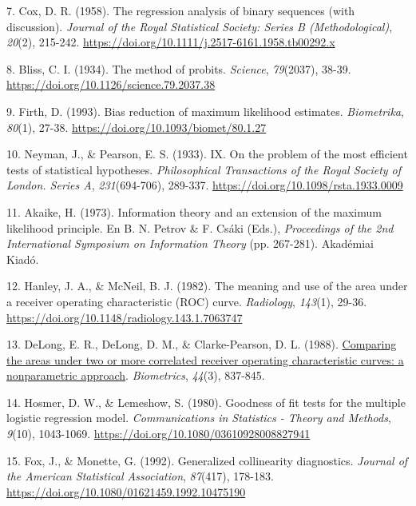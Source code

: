 \documentclass[
  spanish,
  10pt,
]{article}
\newlength{\cslhangindent}
\newenvironment{CSLReferences}[2] %
 {\begin{list}{}{%
  \setlength{\itemindent}{0pt}
  \setlength{\leftmargin}{0pt}
  \setlength{\parsep}{0pt}
  \ifodd #1
   \setlength{\leftmargin}{\cslhangindent}
   \setlength{\itemindent}{-1\cslhangindent}
  \fi
  \setlength{\itemsep}{#2\baselineskip}}}
 {\end{list}}
\begin{document}
\begin{CSLReferences}{1}{0}
7. Cox, D. R. (1958). The regression analysis of binary sequences (with
discussion). \emph{Journal of the Royal Statistical Society: Series B
(Methodological)}, \emph{20}(2), 215-242.
\url{https://doi.org/10.1111/j.2517-6161.1958.tb00292.x}

8. Bliss, C. I. (1934). The method of probits. \emph{Science},
\emph{79}(2037), 38-39. \url{https://doi.org/10.1126/science.79.2037.38}

9. Firth, D. (1993). Bias reduction of maximum likelihood estimates.
\emph{Biometrika}, \emph{80}(1), 27-38.
\url{https://doi.org/10.1093/biomet/80.1.27}

10. Neyman, J., \& Pearson, E. S. (1933). {IX}. {On} the problem of the
most efficient tests of statistical hypotheses. \emph{Philosophical
Transactions of the Royal Society of London. Series A},
\emph{231}(694-706), 289-337.
\url{https://doi.org/10.1098/rsta.1933.0009}

11. Akaike, H. (1973). Information theory and an extension of the
maximum likelihood principle. En B. N. Petrov \& F. Csáki (Eds.),
\emph{Proceedings of the 2nd International Symposium on Information
Theory} (pp. 267-281). Akad{é}miai Kiad{ó}.

12. Hanley, J. A., \& McNeil, B. J. (1982). The meaning and use of the
area under a receiver operating characteristic ({ROC}) curve.
\emph{Radiology}, \emph{143}(1), 29-36.
\url{https://doi.org/10.1148/radiology.143.1.7063747}

13. DeLong, E. R., DeLong, D. M., \& Clarke-Pearson, D. L. (1988).
\href{https://www.ncbi.nlm.nih.gov/pubmed/3203132}{Comparing the areas
under two or more correlated receiver operating characteristic curves: a
nonparametric approach}. \emph{Biometrics}, \emph{44}(3), 837-845.

14. Hosmer, D. W., \& Lemeshow, S. (1980). Goodness of fit tests for the
multiple logistic regression model. \emph{Communications in Statistics -
Theory and Methods}, \emph{9}(10), 1043-1069.
\url{https://doi.org/10.1080/03610928008827941}

15. Fox, J., \& Monette, G. (1992). Generalized collinearity
diagnostics. \emph{Journal of the American Statistical Association},
\emph{87}(417), 178-183.
\url{https://doi.org/10.1080/01621459.1992.10475190}

\end{CSLReferences}
\end{document}
